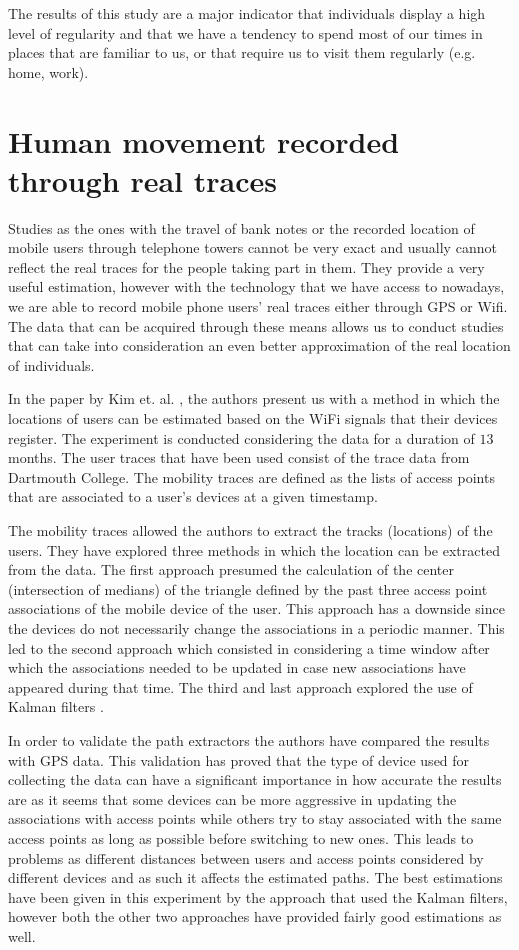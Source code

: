 The results of this study are a major indicator that individuals display a high
level of regularity and that we have a tendency to spend most of our times in
places that are familiar to us, or that require us to visit them regularly (e.g.
home, work).

\section{Human movement recorded through real traces}
Studies as the ones with the travel of bank notes or the recorded location of
mobile users through telephone towers cannot be very exact and usually cannot
reflect the real traces for the people taking part in them. They provide a very
useful estimation, however with the technology that we have access to nowadays,
we are able to record mobile phone users' real traces either through GPS or
Wifi. The data that can be acquired through these means allows us to conduct
studies that can take into consideration an even better approximation of the
real location of individuals.

In the paper by Kim et. al. \cite{Kim06}, the authors present us with a method
in which the locations of users can be estimated based on the WiFi signals that
their devices register. The experiment is conducted considering the data for a
duration of $13$ months. The user traces that have been used consist of the
trace data from Dartmouth College. The mobility traces are defined as the lists
of access points that are associated to a user's devices at a given timestamp.

The mobility traces allowed the authors to extract the tracks (locations) of the
users. They have explored three methods in which the location can be extracted
from the data. The first approach presumed the calculation of the center
(intersection of medians) of the triangle defined by the past three access
point associations of the mobile device of the user. This approach has a
downside since the devices do not necessarily change the associations in a
periodic manner. This led to the second approach which consisted in considering
a time window after which the associations needed to be updated in case new
associations have appeared during that time. The third and last approach
explored the use of Kalman filters \cite{KalmanFilter}.

In order to validate the path extractors the authors have compared the results
with GPS data. This validation has proved that the type of device used for
collecting the data can have a significant importance in how accurate the
results are as it seems that some devices can be more aggressive in updating the
associations with access points while others try to stay associated with the
same access points as long as possible before switching to new ones. This leads
to problems as different distances between users and access points considered by
different devices and as such it affects the estimated paths. The best
estimations have been given in this experiment by the approach that used the
Kalman filters, however both the other two approaches have provided fairly good
estimations as well.

